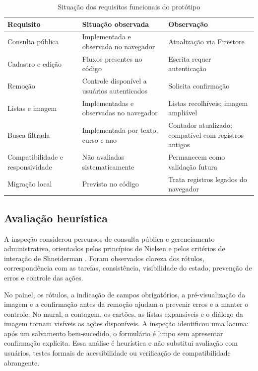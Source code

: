\documentclass[12pt]{article}
\begin{document}
\begin{table}[ht]
\centering
\caption{Situação dos requisitos funcionais do protótipo}
\label{tab:flows}
\begin{tabular}{p{3.0cm}p{5.8cm}p{5.2cm}}
\hline
Requisito & Situação observada & Observação \\
\hline
Consulta pública & Implementada e observada no navegador & Atualização via Firestore \\
Cadastro e edição & Fluxos presentes no código & Escrita requer autenticação \\
Remoção & Controle disponível a usuários autenticados & Solicita confirmação \\
Listas e imagem & Implementadas e observadas no navegador & Listas recolhíveis; imagem ampliável \\
Busca filtrada & Implementada por texto, curso e ano & Contador atualizado; compatível com registros antigos \\
Compatibilidade e responsividade & Não avaliadas sistematicamente & Permanecem como validação futura \\
Migração local & Prevista no código & Trata registros legados do navegador \\
\hline
\end{tabular}
\end{table}

\subsection{Avaliação heurística}

A inspeção considerou percursos de consulta pública e gerenciamento
administrativo, orientados pelos princípios de Nielsen \cite{nielsen1993} e
pelos critérios de interação de Shneiderman \cite{shneiderman2016}. Foram
observados clareza dos rótulos, correspondência com as tarefas, consistência,
visibilidade do estado, prevenção de erros e controle das ações.

No painel, os rótulos, a indicação de campos obrigatórios, a pré-visualização
da imagem e a confirmação antes da remoção ajudam a prevenir erros e a manter o
controle. No mural, a contagem, os cartões, as listas expansíveis e o diálogo
da imagem tornam visíveis as ações disponíveis. A inspeção identificou uma
lacuna: após um salvamento bem-sucedido, o formulário é limpo sem apresentar
confirmação explícita. Essa análise é heurística e não substitui avaliação com
usuários, testes formais de acessibilidade ou verificação de compatibilidade
abrangente.
\end{document}
